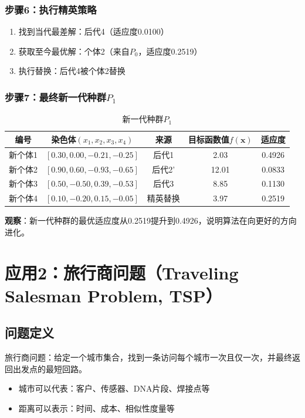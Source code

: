 \subsubsection{步骤6：执行精英策略}

\begin{enumerate}
    \item 找到当代最差解：后代4（适应度0.0100）
    \item 获取至今最优解：个体2（来自$P_0$，适应度0.2519）
    \item 执行替换：后代4被个体2替换
\end{enumerate}

\subsubsection{步骤7：最终新一代种群$P_1$}

\begin{table}[H]
\centering
\caption{新一代种群$P_1$}
\begin{tabular}{|c|c|c|c|c|}
\hline
编号 & 染色体$(x_1, x_2, x_3, x_4)$ & 来源 & 目标函数值$f(\mathbf{x})$ & 适应度 \\
\hline
新个体1 & $[0.30, 0.00, -0.21, -0.25]$ & 后代1 & 2.03 & 0.4926 \\
\hline
新个体2 & $[0.90, 0.60, -0.93, -0.65]$ & 后代2' & 12.01 & 0.0833 \\
\hline
新个体3 & $[0.50, -0.50, 0.39, -0.53]$ & 后代3 & 8.85 & 0.1130 \\
\hline
新个体4 & $[0.10, -0.20, 0.15, -0.05]$ & 精英替换 & 3.97 & 0.2519 \\
\hline
\end{tabular}
\end{table}

\textbf{观察}：新一代种群的最优适应度从0.2519提升到0.4926，说明算法在向更好的方向进化。

\section{应用2：旅行商问题（Traveling Salesman Problem, TSP）}

\subsection{问题定义}

旅行商问题：给定一个城市集合，找到一条访问每个城市一次且仅一次，并最终返回出发点的最短回路。

\begin{itemize}
    \item 城市可以代表：客户、传感器、DNA片段、焊接点等
    \item 距离可以表示：时间、成本、相似性度量等
\end{itemize}

